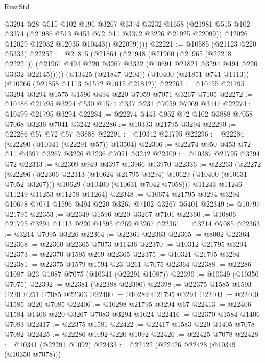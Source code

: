 \begin{lexlean}{RustStd}
\begin{coremodule}
{\begin{coremodule}
{{{{{{{{{{{{{{{{{{{{{{{{{                @3294
                @28
                @515
                @102
                @196
                @3267
                @3374
                @3232
                @1658
                (@21981 @515 @102 @3374 (@21986 @513 @453 @72 @11 @3372 @3226 @21925 @22099))
                @12026
                @12029
                @12032
                @12035
                @10443))
            @22099))))
@22221 := @10585 (@21123 @220 @5333)
@22252 := @21815
    (@21864
      (@21948
        (@21960
          (@21965 (@22218 @22221))
          (@21961 @494 @220 @3267 @3332 (@10691 @21821 @3294 @494 @220 @3332 @22145)))))
    (@13425 (@21847 @204))
    (@10400 (@21851 @741 @1113))
    (@10266 (@21858 @1113 @1572 @7015 @21812))
@22263 := @10455 @21795 @3294 @3294 @1575 @1596 @494 @220 @7059 @7071 @3267 @7105
@22272 := @10486 @21795 @3294 @530 @1574 @337 @231 @7059 @7069 @3447
@22274 := @10499 @21795 @3294
@22284 := @22274 @443 @952 @72 @102 @3888 @7058 @7068 @3236 @7041 @3242
@22286 := @10333 @21795 @3294
@22290 := @22286 @57 @72 @57 @3888
@22291 := @10342 @21795
@22296 := @22284 (@22290 (@10341 (@22291 @57)) @13504)
@22306 := @22274 @950 @453 @72 @11 @4397 @3267 @3226 @3236 @7051 @3242
@22309 := @10387 @21795 @3294 @72
@22313 := @22309 @949 @4397 @13966 @13970
@22336 := @22263
    (@22272
      (@22296
        (@22306 @22313 (@10624 @21795 @3294) @10629 (@10400 (@10631 @7052 @3267)))
        @10629
        (@10400 (@10631 @7042 @7058)))
      @11243
      @11246
      @11249
      @11253
      @11258
      @11264)
@22348 := @10674 @21795 @3294 @3294 @10678 @7071 @1596 @494 @220 @3267 @7102 @3267 @5401
@22349 := @10797 @21795
@22353 := @22349 @1596 @220 @3267 @7101
@22360 := @10806 @21795 @3294 @1113 @220 @1595 @269 @3267
@22361 := @3214 @7085
@22363 := @3214 @7095 @3226
@22364 := @22361 @22363
@22365 := @8002 @22364
@22368 := @22360 @22365 @7073 @11436
@22370 := @10312 @21795 @3294
@22373 := @22370 @1595 @269 @22365
@22375 := @10321 @21795 @3294
@22381 := @22375 @1579 @1594 @23 @261 @7075 @22364
@22388 := @22286 @1087 @23 @1087 @7075 (@10341 (@22291 @1087))
@22390 := @10349 (@10350 @7075)
@22392 := @22381 (@22388 @22390)
@22398 := @22375 @1585 @1593 @220 @251 @7085 @22363
@22400 := @10289 @21795 @3294
@22403 := @22400 @1585 @220 @7085
@22406 := @10298 @21795 @3294 @67
@22413 := @22406 @1584 @1406 @220 @3267 @7083 @3294 @1624
@22416 := @22370 @1584 @1406 @7083
@22417 := @22375 @1581
@22422 := @22417 @1583 @220 @1405 @7078 @7082
@22425 := @22286 @1092 @220 @1092
@22426 := @22425 @7078
@22428 := @10341 (@22291 @1092)
@22433 := @22422 (@22426 @22428 (@10349 (@10350 @7078)))
}}}}}}}}}}}}}}}}}}}}}}}}}
\end{coremodule}}
\end{coremodule}
\end{lexlean}
